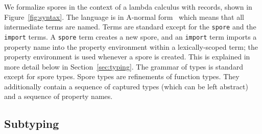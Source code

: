 \documentclass{llncs}
\begin{document}
We formalize spores in the context of a lambda calculus with records, shown in Figure~\ref{fig:syntax}. The language is in A-normal form~\cite{ANF} which means that all intermediate terms are named. Terms are standard except for the \texttt{spore} and the \texttt{import} terms. A \texttt{spore} term creates a new spore, and an \texttt{import} term imports a property name into the property environment within a lexically-scoped term; the property environment is used whenever a spore is created. This is explained in more detail below in Section~\ref{sec:typing}. The grammar of types is standard except for spore types. Spore types are refinements of function types. They additionally contain a sequence of captured types (which can be left abstract) and a sequence of property names.

\subsection{Subtyping}\label{sec:subtyping}
\end{document}
